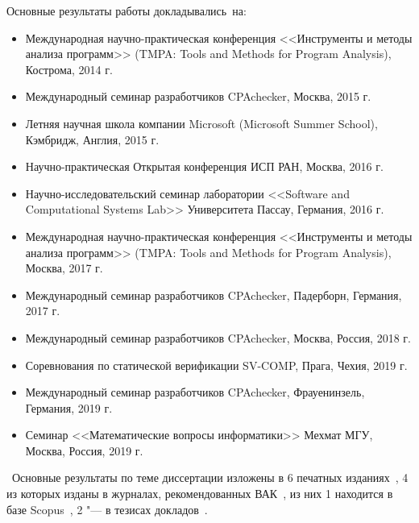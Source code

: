 
{\probation}
Основные результаты работы докладывались~на:
\begin{itemize}
  \item Международная научно-практическая конференция <<Инструменты и методы анализа программ>> (TMPA: Tools and Methods for Program Analysis), Кострома, 2014 г.
  \item Международный семинар разработчиков CPAchecker, Москва, 2015 г.
  \item Летняя научная школа компании Microsoft (Microsoft Summer School), Кэмбридж, Англия, 2015 г.
  \item Научно-практическая Открытая конференция ИСП РАН, Москва, 2016 г.
  \item Научно-исследовательский семинар лаборатории <<Software and Computational Systems Lab>> Университета Пассау, Германия, 2016 г.
  \item Международная научно-практическая конференция <<Инструменты и методы анализа программ>> (TMPA: Tools and Methods for Program Analysis), Москва, 2017 г.
  \item Международный семинар разработчиков CPAchecker, Падерборн, Германия, 2017 г.
  \item Международный семинар разработчиков CPAchecker, Москва, Россия, 2018 г.
  \item Соревнования по статической верификации SV-COMP, Прага, Чехия, 2019 г.
  \item Международный семинар разработчиков CPAchecker, Фрауенинзель, Германия, 2019 г.
  \item Семинар <<Математические вопросы информатики>> Мехмат МГУ, Москва, Россия, 2019 г.
\end{itemize}

\publications\ Основные результаты по теме диссертации изложены в 6 печатных изданиях~\cite{lockatorVAK,lockatorVAK2,TMPA2017,theoryVAK,lockatorSyrcose,lockatorTMPA}, 
    4 из которых изданы в журналах, рекомендованных ВАК~\cite{lockatorVAK,lockatorVAK2,TMPA2017,theoryVAK}, из них 1 находится в базе Scopus~\cite{TMPA2017},
    2 "--- в тезисах докладов~\cite{lockatorSyrcose,lockatorTMPA}.


